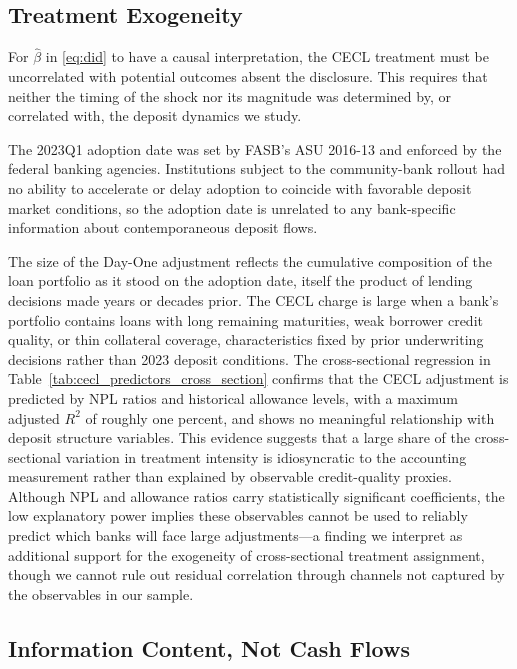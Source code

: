 \subsection{Treatment Exogeneity}
\label{sec:identification:predetermination}

For $\hat{\beta}$ in \eqref{eq:did} to have a causal interpretation,
the CECL treatment must be uncorrelated with potential outcomes absent the
disclosure.  This requires that neither the timing of the shock nor its
magnitude was determined by, or correlated with, the deposit dynamics we
study.

The 2023Q1 adoption date was set by FASB's ASU 2016-13 and enforced by the
federal banking agencies.  Institutions subject to the community-bank rollout
had no ability to accelerate or delay adoption to coincide with favorable
deposit market conditions, so the adoption date is unrelated to any
bank-specific information about contemporaneous deposit flows.

The size of the Day-One adjustment reflects the cumulative composition of the
loan portfolio as it stood on the adoption date, itself the product of
lending decisions made years or decades prior.  The CECL charge is large when
a bank's portfolio contains loans with long remaining maturities, weak
borrower credit quality, or thin collateral coverage, characteristics fixed
by prior underwriting decisions rather than 2023 deposit conditions.  The
cross-sectional regression in Table~\ref{tab:cecl_predictors_cross_section}
confirms that the CECL adjustment is predicted by NPL ratios and historical
allowance levels, with a maximum adjusted $R^2$ of roughly one percent,
and shows no meaningful relationship with deposit structure variables.
This evidence suggests that a large share of the cross-sectional variation
in treatment intensity is idiosyncratic to the accounting measurement rather
than explained by observable credit-quality proxies.  Although NPL and
allowance ratios carry statistically significant coefficients, the low
explanatory power implies these observables cannot be used to reliably predict
which banks will face large adjustments---a finding we interpret as
additional support for the exogeneity of cross-sectional treatment assignment,
though we cannot rule out residual correlation through channels not captured
by the observables in our sample.


\subsection{Information Content, Not Cash Flows}
\label{sec:identification:mechanism}

